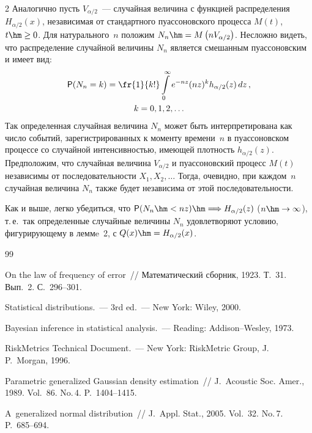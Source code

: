 \begin{multicols}{2}
Аналогично пусть $V_{\alpha/2}$~--- случайная величина с функцией
распределения $H_{\alpha/2}(x)$, независимая от стандартного
пуассоновского процесса $M(t)$, $t\hm\ge0$. Для натурального~$n$
положим $N_n\hm= M\left(nV_{\alpha/2}\right)$. Несложно видеть, что
распределение случайной величины $N_n$ является смешанным
пуассоновским и имеет вид:
\begin{multline*}
{\sf P}(N_n=k)=\fr{1}{k!}\int\limits_{0}^{\infty}e^{-nz}(nz)^kh_{\alpha/2}(z)\,dz\,,\\
 k=0,1,2,\ldots
\end{multline*}
Так определенная случайная величина $N_n$ может быть
интерпретирована как число событий, зарегистрированных к моменту
времени~$n$ в пуассоновском процессе со случайной интенсивностью,
имеющей плотность $h_{\alpha/2}(z)$. Предположим, что случайная
величина $V_{\alpha/2}$ и пуассоновский процесс $M(t)$ независимы от
последовательности $X_1,X_2,\ldots$ Тогда, очевидно, при каждом~$n$
случайная величина $N_n$ также будет независима от этой
последовательности.

Как и выше, легко убедиться, что ${\sf P}(N_n\hm<nz)\hm\Longrightarrow
H_{\alpha/2}(z)$ ($n\hm\to\infty$), т.\,е.\ так определенные случайные
величины $N_n$ удовлетворяют условию, фигурирующему в леммe~2, с
$Q(x)\hm=H_{\alpha/2}(x)$.


{\small\frenchspacing
{%
\begin{thebibliography}{99}

 On the law of frequency
of error~// Математический сборник, 1923. Т.~31. Вып.~2.
С.~296--301.

 Statistical
distributions.~--- 3rd ed.~--- New York: Wiley, 2000.

  Bayesian inference in statistical analysis.~--- 
Reading: Addison--Wesley, 1973.

RiskMetrics Technical Document.~---
New York: RiskMetric Group, J.\,P.~Morgan, 1996.

 Parametric
generalized Gaussian density estimation~// J.~Acoustic
Soc. Amer., 1989. Vol.~86. No.\,4. P.~1404--1415.

 A~generalized normal
distribution~// J.~Appl. Stat., 2005. Vol.~32. No.\,7. P.~685--694.


\end{thebibliography}}}
\end{multicols}
